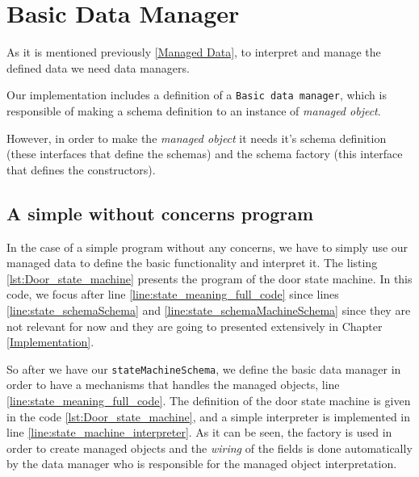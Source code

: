 \section{Basic Data Manager}
As it is mentioned previously \ref{Managed Data}, to interpret and manage the defined data we need data managers.

Our implementation includes a definition of a \texttt{Basic data manager}, which is responsible of making a schema definition to an instance of \textit{managed object}.

However, in order to make the \textit{managed object} it needs it's schema definition (these interfaces that define the schemas) and the schema factory (this interface that defines the constructors).

\subsection{A simple without concerns program}
In the case of a simple program without any concerns, we have to simply use our managed data to define the basic functionality and interpret it.
The listing \ref{lst:Door_state_machine} presents the program of the door state machine.
In this code, we focus after line \ref{line:state_meaning_full_code} since lines \ref{line:state_schemaSchema} and \ref{line:state_schemaMachineSchema} since they are not relevant for now and they are going to presented extensively in Chapter \ref{Implementation}.

So after we have our \texttt{stateMachineSchema}, we define the basic data manager in order to have a mechanisms that handles the managed objects, line \ref{line:state_meaning_full_code}.
The definition of the door state machine is given in the code \ref{lst:Door_state_machine}, and a simple interpreter is implemented in line \ref{line:state_machine_interpreter}.
As it can be seen, the factory is used in order to create managed objects and the \textit{wiring} of the fields is done automatically by the data manager who is responsible for the managed object interpretation.

